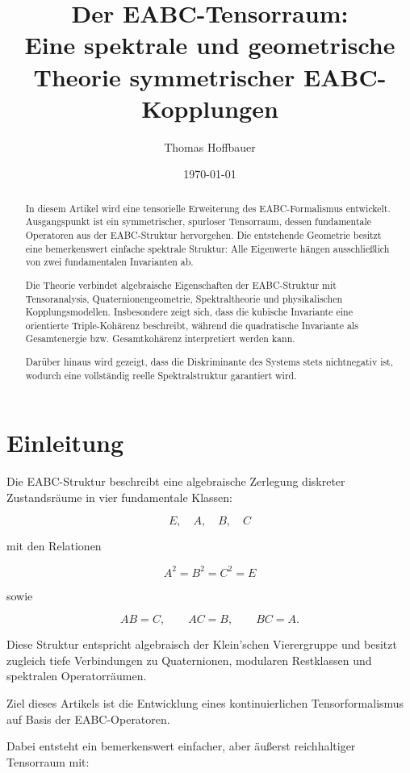 \documentclass[11pt,a4paper]{article}
\title{Der EABC-Tensorraum:\\
	Eine spektrale und geometrische Theorie symmetrischer EABC-Kopplungen}
\author{Thomas Hoffbauer}
\date{\today}
\theoremstyle{definition}
\begin{document}
	
	\maketitle
	
	\begin{abstract}
		In diesem Artikel wird eine tensorielle Erweiterung des EABC-Formalismus entwickelt. Ausgangspunkt ist ein symmetrischer, spurloser Tensorraum, dessen fundamentale Operatoren aus der EABC-Struktur hervorgehen. Die entstehende Geometrie besitzt eine bemerkenswert einfache spektrale Struktur: Alle Eigenwerte hängen ausschließlich von zwei fundamentalen Invarianten ab. 
		
		Die Theorie verbindet algebraische Eigenschaften der EABC-Struktur mit Tensoranalysis, Quaternionengeometrie, Spektraltheorie und physikalischen Kopplungsmodellen. Insbesondere zeigt sich, dass die kubische Invariante eine orientierte Triple-Kohärenz beschreibt, während die quadratische Invariante als Gesamtenergie bzw. Gesamtkohärenz interpretiert werden kann.
		
		Darüber hinaus wird gezeigt, dass die Diskriminante des Systems stets nichtnegativ ist, wodurch eine vollständig reelle Spektralstruktur garantiert wird.
	\end{abstract}
	
	\tableofcontents
	
	\newpage
	
	\section{Einleitung}
	
	Die EABC-Struktur beschreibt eine algebraische Zerlegung diskreter Zustandsräume in vier fundamentale Klassen:
	
	\[
	E,\quad A,\quad B,\quad C
	\]
	
	mit den Relationen
	
	\[
	A^2=B^2=C^2=E
	\]
	
	sowie
	
	\[
	AB=C,\qquad AC=B,\qquad BC=A.
	\]
	
	Diese Struktur entspricht algebraisch der Klein'schen Vierergruppe und besitzt zugleich tiefe Verbindungen zu Quaternionen, modularen Restklassen und spektralen Operatorräumen.
	
	Ziel dieses Artikels ist die Entwicklung eines kontinuierlichen Tensorformalismus auf Basis der EABC-Operatoren.
	
	Dabei entsteht ein bemerkenswert einfacher, aber äußerst reichhaltiger Tensorraum mit:
	
\end{document}
